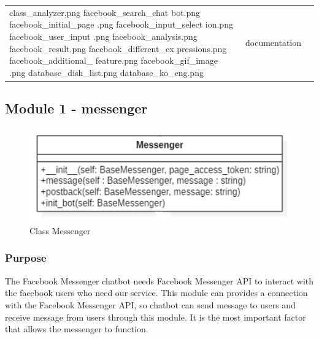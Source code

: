 \begin{table}[htbp]
\begin{tabularx}{\linewidth}{|X|X|X|}
class\_analyzer.png \newline
facebook\_search\_chat bot.png \newline
facebook\_initial\_page .png \newline
facebook\_input\_select ion.png \newline
facebook\_user\_input .png \newline
facebook\_analysis.png \newline
facebook\_result.png \newline
facebook\_different\_ex pressions.png \newline
facebook\_additional\_ feature.png \newline
facebook\_gif\_image .png \newline
database\_dish\_list.png \newline
database\_ko\_eng.png
& documentation \\
\end{tabularx}
\end{table}
\FloatBarrier

\subsection{Module 1 - messenger} 

\begin{figure}[htbp]
\centerline{\includegraphics[width=\linewidth]{./pictures/class_messenger}}
\caption{Class Messenger}
\label{fig:class_messenger}
\end{figure}
\FloatBarrier

\subsubsection {Purpose}

The Facebook Messenger chatbot needs Facebook Messenger API to interact with the facebook users who need our service. This module can provides a connection with the Facebook Messenger API, so chatbot can send message to users and receive message from users through this module. It is the most important factor that allows the messenger to function.  \newline

